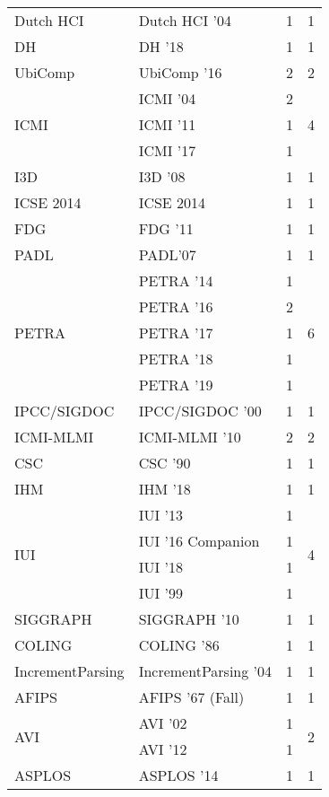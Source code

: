 \begin{table*}[t]
\begin{tabular}{llrr}
\multirow{1}{*}{Dutch HCI } & Dutch HCI '04 & 1 & \multirow{1}{*}{1}\\
\multirow{1}{*}{DH } & DH '18 & 1 & \multirow{1}{*}{1}\\
\multirow{1}{*}{UbiComp } & UbiComp '16 & 2 & \multirow{1}{*}{2}\\
\multirow{3}{*}{ICMI } & ICMI '04 & 2 & \multirow{3}{*}{4}\\
& ICMI '11 & 1 &\\
& ICMI '17 & 1 &\\
\multirow{1}{*}{I3D } & I3D '08 & 1 & \multirow{1}{*}{1}\\
\multirow{1}{*}{ICSE 2014} & ICSE 2014 & 1 & \multirow{1}{*}{1}\\
\multirow{1}{*}{FDG } & FDG '11 & 1 & \multirow{1}{*}{1}\\
\multirow{1}{*}{PADL} & PADL'07 & 1 & \multirow{1}{*}{1}\\
\multirow{5}{*}{PETRA } & PETRA '14 & 1 & \multirow{5}{*}{6}\\
& PETRA '16 & 2 &\\
& PETRA '17 & 1 &\\
& PETRA '18 & 1 &\\
& PETRA '19 & 1 &\\
\multirow{1}{*}{IPCC/SIGDOC } & IPCC/SIGDOC '00 & 1 & \multirow{1}{*}{1}\\
\multirow{1}{*}{ICMI-MLMI } & ICMI-MLMI '10 & 2 & \multirow{1}{*}{2}\\
\multirow{1}{*}{CSC } & CSC '90 & 1 & \multirow{1}{*}{1}\\
\multirow{1}{*}{IHM } & IHM '18 & 1 & \multirow{1}{*}{1}\\
\multirow{4}{*}{IUI } & IUI '13 & 1 & \multirow{4}{*}{4}\\
& IUI '16 Companion & 1 &\\
& IUI '18 & 1 &\\
& IUI '99 & 1 &\\
\multirow{1}{*}{SIGGRAPH } & SIGGRAPH '10 & 1 & \multirow{1}{*}{1}\\
\multirow{1}{*}{COLING } & COLING '86 & 1 & \multirow{1}{*}{1}\\
\multirow{1}{*}{IncrementParsing } & IncrementParsing '04 & 1 & \multirow{1}{*}{1}\\
\multirow{1}{*}{AFIPS } & AFIPS '67 (Fall) & 1 & \multirow{1}{*}{1}\\
\multirow{2}{*}{AVI } & AVI '02 & 1 & \multirow{2}{*}{2}\\
& AVI '12 & 1 &\\
\multirow{1}{*}{ASPLOS } & ASPLOS '14 & 1 & \multirow{1}{*}{1}\\

\end{tabular}
\end{table*}
